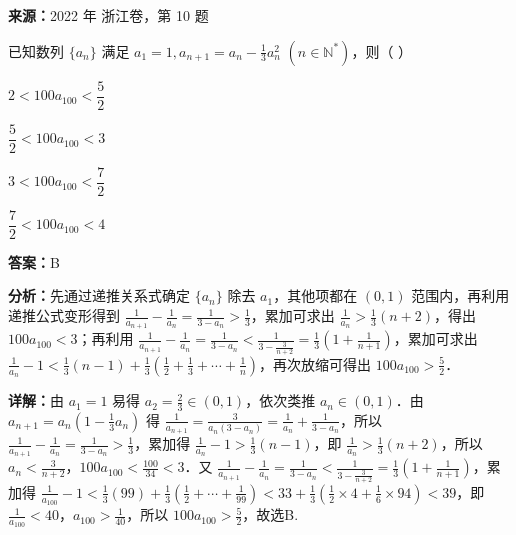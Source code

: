 \begin{question}[points=4]
\textbf{来源：}2022 年 浙江卷，第 10 题\par
已知数列 $\{a_n\}$ 满足 $a_1 = 1, a_{n+1} = a_n - \frac{1}{3}a_n^2$ $(n \in \mathbb{N}^*)$，则（ ）
\begin{choices}
  \item $2 < 100a_{100} < \dfrac{5}{2}$
  \item $\dfrac{5}{2} < 100a_{100} < 3$
  \item $3 < 100a_{100} < \dfrac{7}{2}$
  \item $\dfrac{7}{2} < 100a_{100} < 4$
\end{choices}
\begin{solution}
\textbf{答案：}B

\textbf{分析：}先通过递推关系式确定 $\{a_n\}$ 除去 $a_1$，其他项都在 $(0,1)$ 范围内，再利用递推公式变形得到 $\frac{1}{a_{n+1}} - \frac{1}{a_n} = \frac{1}{3-a_n} > \frac{1}{3}$，累加可求出 $\frac{1}{a_n} > \frac{1}{3}(n+2)$，得出 $100a_{100} < 3$；再利用 $\frac{1}{a_{n+1}} - \frac{1}{a_n} = \frac{1}{3-a_n} < \frac{1}{3-\frac{3}{n+2}} = \frac{1}{3}\left(1+\frac{1}{n+1}\right)$，累加可求出 $\frac{1}{a_n} - 1 < \frac{1}{3}(n-1) + \frac{1}{3}\left(\frac{1}{2}+\frac{1}{3}+\cdots+\frac{1}{n}\right)$，再次放缩可得出 $100a_{100} > \frac{5}{2}$．

\textbf{详解：}由 $a_1=1$ 易得 $a_2=\frac{2}{3} \in (0,1)$，依次类推 $a_n \in (0,1)$．由 $a_{n+1}=a_n\left(1-\frac{1}{3}a_n\right)$ 得 $\frac{1}{a_{n+1}} = \frac{3}{a_n(3-a_n)} = \frac{1}{a_n} + \frac{1}{3-a_n}$，所以 $\frac{1}{a_{n+1}} - \frac{1}{a_n} = \frac{1}{3-a_n} > \frac{1}{3}$，累加得 $\frac{1}{a_n} - 1 > \frac{1}{3}(n-1)$，即 $\frac{1}{a_n} > \frac{1}{3}(n+2)$，所以 $a_n < \frac{3}{n+2}$，$100a_{100} < \frac{100}{34} < 3$．又 $\frac{1}{a_{n+1}} - \frac{1}{a_n} = \frac{1}{3-a_n} < \frac{1}{3-\frac{3}{n+2}} = \frac{1}{3}\left(1+\frac{1}{n+1}\right)$，累加得 $\frac{1}{a_{100}} - 1 < \frac{1}{3}(99) + \frac{1}{3}\left(\frac{1}{2}+\cdots+\frac{1}{99}\right) < 33 + \frac{1}{3}\left(\frac{1}{2}\times4 + \frac{1}{6}\times94\right) < 39$，即 $\frac{1}{a_{100}} < 40$，$a_{100} > \frac{1}{40}$，所以 $100a_{100} > \frac{5}{2}$，故选B.
\end{solution}
\end{question}

